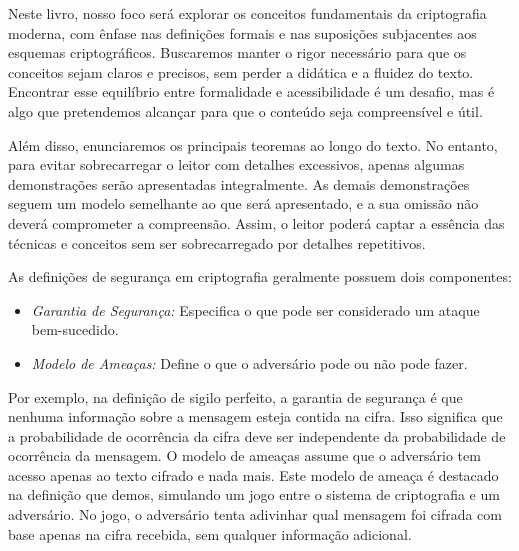 Neste livro, nosso foco será explorar os conceitos fundamentais da criptografia moderna, com ênfase nas definições formais e nas suposições subjacentes aos esquemas criptográficos.
Buscaremos manter o rigor necessário para que os conceitos sejam claros e precisos, sem perder a didática e a fluidez do texto.
Encontrar esse equilíbrio entre formalidade e acessibilidade é um desafio, mas é algo que pretendemos alcançar para que o conteúdo seja compreensível e útil.

Além disso, enunciaremos os principais teoremas ao longo do texto.
No entanto, para evitar sobrecarregar o leitor com detalhes excessivos, apenas algumas demonstrações serão apresentadas integralmente.
As demais demonstrações seguem um modelo semelhante ao que será apresentado, e a sua omissão não deverá comprometer a compreensão.
Assim, o leitor poderá captar a essência das técnicas e conceitos sem ser sobrecarregado por detalhes repetitivos.

As definições de segurança em criptografia geralmente possuem dois componentes:
\begin{itemize}
\item[] {\em Garantia de Segurança:} Especifica o que pode ser considerado um ataque bem-sucedido.
\item[] {\em Modelo de Ameaças:} Define o que o adversário pode ou não pode fazer.
\end{itemize}

Por exemplo, na definição de sigilo perfeito, a garantia de segurança é que nenhuma informação sobre a mensagem esteja contida na cifra.
Isso significa que a probabilidade de ocorrência da cifra deve ser independente da probabilidade de ocorrência da mensagem.
O modelo de ameaças assume que o adversário tem acesso apenas ao texto cifrado e nada mais.
Este modelo de ameaça é destacado na definição que demos, simulando um jogo entre o sistema de criptografia e um adversário.
No jogo, o adversário tenta adivinhar qual mensagem foi cifrada com base apenas na cifra recebida, sem qualquer informação adicional.

